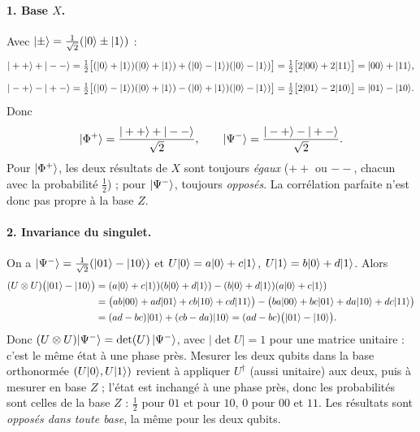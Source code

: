 \begin{correction}
\paragraph{1. Base $X$.} Avec $|\pm\rangle=\frac{1}{\sqrt2}(|0\rangle\pm|1\rangle)$ :
\[
  |++\rangle+|--\rangle=\tfrac12\big[(|0\rangle+|1\rangle)(|0\rangle+|1\rangle)+(|0\rangle-|1\rangle)(|0\rangle-|1\rangle)\big]
  =\tfrac12\big[2|00\rangle+2|11\rangle\big]=|00\rangle+|11\rangle,
\]
\[
  |-+\rangle-|+-\rangle=\tfrac12\big[(|0\rangle-|1\rangle)(|0\rangle+|1\rangle)-(|0\rangle+|1\rangle)(|0\rangle-|1\rangle)\big]
  =\tfrac12\big[2|01\rangle-2|10\rangle\big]=|01\rangle-|10\rangle.
\]
Donc
\[
  |\Phi^+\rangle=\frac{|++\rangle+|--\rangle}{\sqrt2},\qquad|\Psi^-\rangle=\frac{|-+\rangle-|+-\rangle}{\sqrt2}.
\]
Pour $|\Phi^+\rangle$, les deux résultats de $X$ sont toujours \emph{égaux} ($++$ ou $--$, chacun avec la
probabilité $\frac12$) ; pour $|\Psi^-\rangle$, toujours \emph{opposés}. La corrélation parfaite n'est
donc pas propre à la base $Z$.

\paragraph{2. Invariance du singulet.} On a $|\Psi^-\rangle=\frac{1}{\sqrt2}(|01\rangle-|10\rangle)$ et
$U|0\rangle=a|0\rangle+c|1\rangle$, $U|1\rangle=b|0\rangle+d|1\rangle$. Alors
\begin{align*}
  (U\otimes U)\big(|01\rangle-|10\rangle\big)
  &=(a|0\rangle+c|1\rangle)(b|0\rangle+d|1\rangle)-(b|0\rangle+d|1\rangle)(a|0\rangle+c|1\rangle)\\
  &=\big(ab|00\rangle+ad|01\rangle+cb|10\rangle+cd|11\rangle\big)-\big(ba|00\rangle+bc|01\rangle+da|10\rangle+dc|11\rangle\big)\\
  &=(ad-bc)|01\rangle+(cb-da)|10\rangle=(ad-bc)\big(|01\rangle-|10\rangle\big).
\end{align*}
Donc $(U\otimes U)|\Psi^-\rangle=\det(U)\,|\Psi^-\rangle$, avec $|\det U|=1$ pour une matrice unitaire : c'est le
même état à une phase près. Mesurer les deux qubits dans la base orthonormée $(U|0\rangle,U|1\rangle)$
revient à appliquer $U^\dagger$ (aussi unitaire) aux deux, puis à mesurer en base $Z$ ; l'état est inchangé
à une phase près, donc les probabilités sont celles de la base $Z$ : $\frac12$ pour $01$ et pour $10$,
$0$ pour $00$ et $11$. Les résultats sont \emph{opposés dans toute base}, la même pour les deux qubits.


\end{correction}
